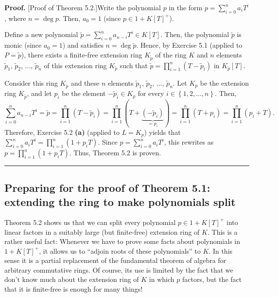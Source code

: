 \documentclass[numbers=enddot,12pt,final,onecolumn,notitlepage]{scrartcl}%
\newenvironment{proof}[1][Proof]{\noindent\textbf{#1.} }{\ \rule{0.5em}{0.5em}}
\begin{document}
\begin{proof}
[Proof of Theorem 5.2.]Write the polynomial $p$ in the form $p=\sum
\limits_{i=0}^{n}a_{i}T^{i}$, where $n=\deg p$. Then, $a_{0}=1$ (since
$p\in1+K\left[  T\right]  ^{+}$).

Define a new polynomial $\widetilde{p}=\sum\limits_{i=0}^{n}a_{n-i}T^{i}\in
K\left[  T\right]  $. Then, the polynomial $\widetilde{p}$ is monic (since
$a_{0}=1$) and satisfies $n=\deg\widetilde{p}$. Hence, by Exercise 5.1
(applied to $P=\widetilde{p}$), there exists a finite-free extension ring
$K_{\widetilde{p}}$ of the ring $K$ and $n$ elements $\widetilde{p}_{1}$,
$\widetilde{p}_{2}$, $...$, $\widetilde{p}_{n}$ of this extension ring
$K_{\widetilde{p}}$ such that $\widetilde{p}=\prod\limits_{i=1}^{n}\left(
T-\widetilde{p}_{i}\right)  $ in $K_{\widetilde{p}}\left[  T\right]  $.

Consider this ring $K_{\widetilde{p}}$ and these $n$ elements $\widetilde{p}%
_{1}$, $\widetilde{p}_{2}$, $...$, $\widetilde{p}_{n}$. Let $K_{p}$ be the
extension ring $K_{\widetilde{p}}$, and let $p_{i}$ be the element
$-\widetilde{p}_{i}\in K_{p}$ for every $i\in\left\{  1,2,...,n\right\}  $.
Then,
\[
\sum\limits_{i=0}^{n}a_{n-i}T^{i}=\widetilde{p}=\prod\limits_{i=1}^{n}\left(
T-\widetilde{p}_{i}\right)  =\prod\limits_{i=1}^{n}\left(
T+\underbrace{\left(  -\widetilde{p}_{i}\right)  }_{=p_{i}}\right)
=\prod\limits_{i=1}^{n}\left(  T+p_{i}\right)  =\prod\limits_{i=1}^{n}\left(
p_{i}+T\right)  .
\]
Therefore, Exercise 5.2 \textbf{(a)} (applied to $L=K_{p}$) yields that
$\sum\limits_{i=0}^{n}a_{i}T^{i}=\prod\limits_{i=1}^{n}\left(  1+p_{i}%
T\right)  $. Since $p=\sum\limits_{i=0}^{n}a_{i}T^{i}$, this rewrites as
$p=\prod\limits_{i=1}^{n}\left(  1+p_{i}T\right)  $. Thus, Theorem 5.2 is proven.
\end{proof}

\subsection{Preparing for the proof of Theorem 5.1: extending the ring to make
polynomials split}

Theorem 5.2 shows us that we can split every polynomial $p\in1+K\left[
T\right]  ^{+}$ into linear factors in a suitably large (but finite-free)
extension ring of $K$. This is a rather useful fact: Whenever we have to prove
some facts about polynomials in $1+K\left[  T\right]  ^{+}$, it allows us to
``adjoin roots of these polynomials'' to $K$. In this sense it is a partial
replacement of the fundamental theorem of algebra for arbitrary commutative
rings. Of course, its use is limited by the fact that we don't know much about
the extension ring of $K$ in which $p$ factors, but the fact that it is
finite-free is enough for many things!
\end{document}
